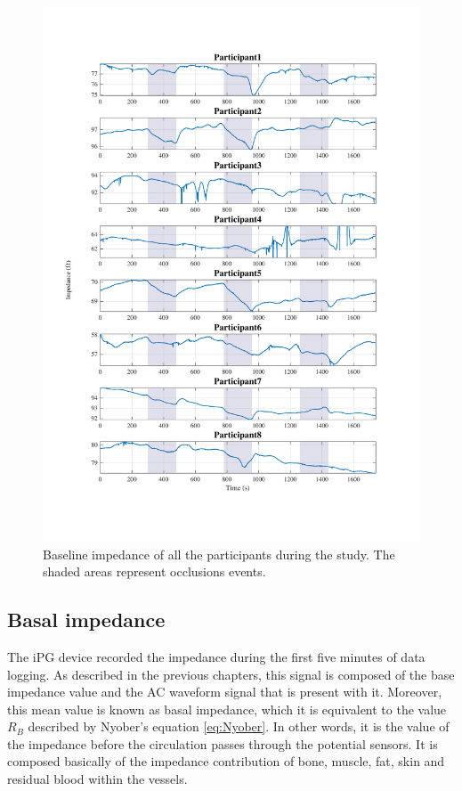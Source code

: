 \begin{figure}
	\includegraphics[width=\textwidth,height=\textheight,keepaspectratio]{figure1}    
	\caption{Baseline impedance of all the participants during the study. The shaded areas represent occlusions events.}
	\label{fig:rb:all_participants}
\end{figure}


\subsection{Basal impedance}
\label{section5.1.1}
The iPG device recorded the impedance during the first five minutes of data logging. As described in the previous chapters, this signal is composed of the base impedance value and the AC waveform signal that is present with it. Moreover, this mean value is known as basal impedance, which it is equivalent to the value $R_B$ described by Nyober's equation \ref{eq:Nyober}. In other words, it is the value of the impedance before the circulation passes through the potential sensors. It is composed basically of the impedance contribution of bone, muscle, fat, skin and residual blood within the vessels. 

